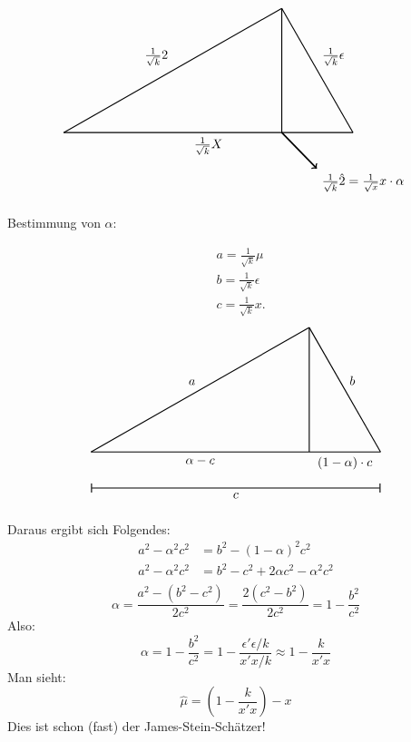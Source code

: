 \documentclass[10pt]{article}
\begin{document}
	\begin{align*}
		\begin{tikzpicture}
			\draw[thick, -] (0,0) -- node[midway, above left] {$\frac{1}{\sqrt{k}}\mu$} (6.029836,3.446703);
			\draw[thick, -] (6.029836,3.446703) -- node[midway, above right] {$\frac{1}{\sqrt{k}}\epsilon$} (8,0);
			\draw[thick, -] (0,0) -- node[midway, below] {$\frac{1}{\sqrt{k}}X$} (8,0);
			\draw[thick, -] (6.029836,0) -- (6.029836,3.446703);
			\draw[very thick, ->] (6.029836,0) -- (7,-1) node[below right] {$\frac{1}{\sqrt{k}} \hat{\mu} = \frac{1}{\sqrt{x}} x \cdot \alpha$};
		\end{tikzpicture}
	\end{align*}	
	
	Bestimmung von $\alpha$:
	
	\begin{equation*}
		\begin{split}
			&a = \frac{1}{\sqrt{k}} \mu\\
			&b = \frac{1}{\sqrt{k}} \epsilon\\
			&c = \frac{1}{\sqrt{k}} x.
		\end{split}
	\end{equation*}
		\begin{align*}
		\begin{tikzpicture}
			\draw[thick, -] (0,0) -- node[midway, above left] {$a$} (6.029836,3.446703);
			\draw[thick, -] (6.029836,3.446703) -- node[midway, above right] {$b$} (8,0);
			\draw[thick, -] (0,0) -- node[midway, below] {$\alpha - c$} (6.029863,0);
			\draw[thick, -] (6.029863,0) -- node[midway, below] {$(1- \alpha) \cdot c$} (8,0);
			\draw[thick, -] (6.029836,0) -- (6.029836,3.446703);
			\draw[thick, |-|] (0,-1) --node[midway, below] {$c$} (8,-1);
		\end{tikzpicture}
	\end{align*}
	
	Daraus ergibt sich Folgendes: 
	\begin{equation*}
		\begin{split}
			a^2 - \alpha^2 c^2 &= b^2 - (1-\alpha)^2 c^2\\
			a^2 -\alpha^2 c^2 &= b^2 - c^2 + 2 \alpha c^2 - \alpha^2 c^2 \\
		\end{split}
	\end{equation*}
	\begin{equation*}
		\alpha = \frac{a^2-(b^2-c^2)}{2c^2} = \frac{2(c^2-b^2)}{2c^2} = 1-\frac{b^2}{c^2}
	\end{equation*}
	Also:
	\begin{equation*}
		\alpha = 1-\frac{b^2}{c^2} = 1-\frac{\epsilon' \epsilon / k}{x'x/k} \approx 1-\frac{k}{x'x}
	\end{equation*}
	Man sieht:
	\begin{equation*}
		\hat{\mu}= \left(1- \frac{k}{x'x}\right)-x
	\end{equation*}
	Dies ist schon (fast) der James-Stein-Schätzer!
	
\end{document}
